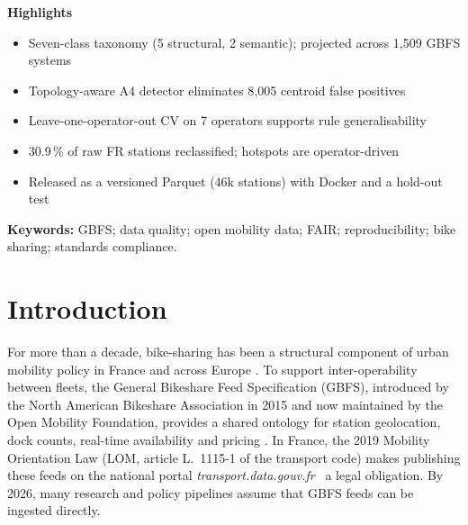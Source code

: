 \documentclass[11pt,a4paper]{article}
\newenvironment{highlights}{%
  \par\noindent\textsf{\bfseries\large Highlights}\par\smallskip
  \begin{itemize}[leftmargin=1.4em,itemsep=0.15em,topsep=0.2em]}{%
  \end{itemize}\par\medskip}
\begin{document}
\begin{highlights}
\item Seven-class taxonomy (5 structural, 2 semantic); projected across 1{,}509 GBFS systems
\item Topology-aware A4 detector eliminates 8{,}005 centroid false positives
\item Leave-one-operator-out CV on 7 operators supports rule generalisability
\item 30.9\,\% of raw FR stations reclassified; hotspots are operator-driven
\item Released as a versioned Parquet (46k stations) with Docker and a hold-out test
\end{highlights}

\noindent\textbf{Keywords:} GBFS; data quality; open mobility data; FAIR; reproducibility; bike sharing; standards compliance.


\section{Introduction}

For more than a decade, bike-sharing has been a structural component of
urban mobility policy in France and across Europe
\cite{Pucher2010Infrastructure}. To support inter-operability between
fleets, the General Bikeshare Feed Specification (GBFS), introduced by the
North American Bikeshare Association in 2015 and now maintained by the
Open Mobility Foundation, provides a shared ontology for station
geolocation, dock counts, real-time availability and pricing
\cite{Mobi2024,OMF2023}. In France, the 2019 Mobility Orientation Law
\cite{LOM2019} (LOM, article L.~1115-1 of the transport code) makes
publishing these feeds on the national portal
\emph{transport.data.gouv.fr}~\cite{PAN2017} a legal obligation. By 2026,
many research and policy pipelines assume that GBFS feeds can be ingested
directly.
\end{document}
